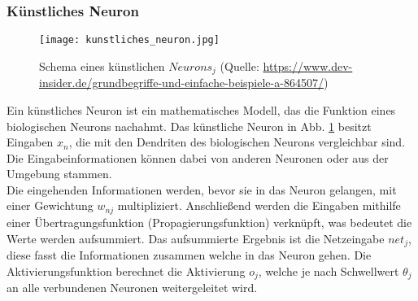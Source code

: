 \subsubsection{Künstliches Neuron}
\label{subsubsec:KünstlichesNeuron}
\begin{figure}[ht]
	\centering
	\texttt{[image: kunstliches\_neuron.jpg]}
	\caption{Schema eines künstlichen $Neurons_j$ (Quelle: \url{https://www.dev-insider.de/grundbegriffe-und-einfache-beispiele-a-864507/})}
	\label{fig:KünstlichesNeuron}
\end{figure}
Ein künstliches Neuron ist ein mathematisches Modell, das die Funktion eines biologischen Neurons nachahmt. Das künstliche Neuron in Abb. \ref{fig:KünstlichesNeuron} besitzt Eingaben $x_n$, die mit den Dendriten des biologischen Neurons vergleichbar sind. Die Eingabeinformationen können dabei von anderen Neuronen oder aus der Umgebung stammen. \\
Die eingehenden Informationen werden, bevor sie in das Neuron gelangen, mit einer Gewichtung $w_{nj}$ multipliziert. Anschließend werden die Eingaben mithilfe einer Übertragungsfunktion (Propagierungsfunktion) verknüpft, was bedeutet die Werte werden aufsummiert. Das aufsummierte Ergebnis ist die Netzeingabe $net_j$, diese fasst die Informationen zusammen welche in das Neuron gehen. Die Aktivierungsfunktion berechnet die Aktivierung $o_j$, welche je nach Schwellwert $\theta_j$ an alle verbundenen Neuronen weitergeleitet wird. \cite[vgl.][]{JuergenCleve2020}  

